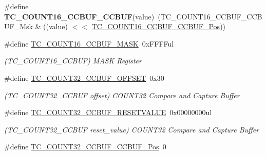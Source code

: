\begin{DoxyCompactItemize}
\item 
\hypertarget{group___s_a_m_l21___t_c_ga42b7a5791c5930aea30b8ac0eb42ea03}{}\#define {\bfseries T\+C\+\_\+\+C\+O\+U\+N\+T16\+\_\+\+C\+C\+B\+U\+F\+\_\+\+C\+C\+B\+U\+F}(value)~(T\+C\+\_\+\+C\+O\+U\+N\+T16\+\_\+\+C\+C\+B\+U\+F\+\_\+\+C\+C\+B\+U\+F\+\_\+\+Msk \& ((value) $<$$<$ \hyperlink{group___s_a_m_l21___t_c_gaa82f4b8e0681376c024b934cc3e47d6a}{T\+C\+\_\+\+C\+O\+U\+N\+T16\+\_\+\+C\+C\+B\+U\+F\+\_\+\+C\+C\+B\+U\+F\+\_\+\+Pos}))\label{group___s_a_m_l21___t_c_ga42b7a5791c5930aea30b8ac0eb42ea03}

\item 
\hypertarget{group___s_a_m_l21___t_c_ga525182bfb54d04668c34a01b8a8100af}{}\#define \hyperlink{group___s_a_m_l21___t_c_ga525182bfb54d04668c34a01b8a8100af}{T\+C\+\_\+\+C\+O\+U\+N\+T16\+\_\+\+C\+C\+B\+U\+F\+\_\+\+M\+A\+S\+K}~0x\+F\+F\+F\+Ful\label{group___s_a_m_l21___t_c_ga525182bfb54d04668c34a01b8a8100af}

\begin{DoxyCompactList}\small\item\em (T\+C\+\_\+\+C\+O\+U\+N\+T16\+\_\+\+C\+C\+B\+U\+F) M\+A\+S\+K Register \end{DoxyCompactList}\item 
\hypertarget{group___s_a_m_l21___t_c_gad759e1668330673f0d759403030fcd6b}{}\#define \hyperlink{group___s_a_m_l21___t_c_gad759e1668330673f0d759403030fcd6b}{T\+C\+\_\+\+C\+O\+U\+N\+T32\+\_\+\+C\+C\+B\+U\+F\+\_\+\+O\+F\+F\+S\+E\+T}~0x30\label{group___s_a_m_l21___t_c_gad759e1668330673f0d759403030fcd6b}

\begin{DoxyCompactList}\small\item\em (T\+C\+\_\+\+C\+O\+U\+N\+T32\+\_\+\+C\+C\+B\+U\+F offset) C\+O\+U\+N\+T32 Compare and Capture Buffer \end{DoxyCompactList}\item 
\hypertarget{group___s_a_m_l21___t_c_ga5f87b410c5840acc8fa03811ee86f103}{}\#define \hyperlink{group___s_a_m_l21___t_c_ga5f87b410c5840acc8fa03811ee86f103}{T\+C\+\_\+\+C\+O\+U\+N\+T32\+\_\+\+C\+C\+B\+U\+F\+\_\+\+R\+E\+S\+E\+T\+V\+A\+L\+U\+E}~0x00000000ul\label{group___s_a_m_l21___t_c_ga5f87b410c5840acc8fa03811ee86f103}

\begin{DoxyCompactList}\small\item\em (T\+C\+\_\+\+C\+O\+U\+N\+T32\+\_\+\+C\+C\+B\+U\+F reset\+\_\+value) C\+O\+U\+N\+T32 Compare and Capture Buffer \end{DoxyCompactList}\item 
\hypertarget{group___s_a_m_l21___t_c_ga1c70d88b4942aef5ccfb80e76fafc08d}{}\#define \hyperlink{group___s_a_m_l21___t_c_ga1c70d88b4942aef5ccfb80e76fafc08d}{T\+C\+\_\+\+C\+O\+U\+N\+T32\+\_\+\+C\+C\+B\+U\+F\+\_\+\+C\+C\+B\+U\+F\+\_\+\+Pos}~0\label{group___s_a_m_l21___t_c_ga1c70d88b4942aef5ccfb80e76fafc08d}


\end{DoxyCompactItemize}
